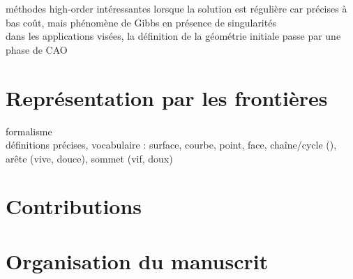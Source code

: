 méthodes high-order intéressantes lorsque la solution est régulière car précises à bas coût, mais phénomène de Gibbs en présence de singularités \cite{bruno2007}\\

dans les applications visées, la définition de la géométrie initiale passe par une phase de CAO


\section{Représentation par les frontières}
formalisme \brep~ \cite[Section 2.2]{pentcheva2010}\\
définitions précises, vocabulaire : surface, courbe, point, face, chaîne/cycle (), arête (vive, douce), sommet (vif, doux)


\section{Contributions}%


\section{Organisation du manuscrit}